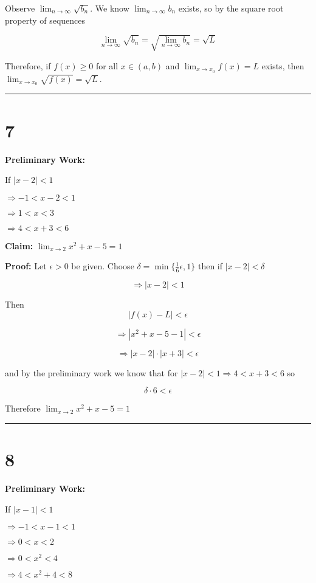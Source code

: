 \documentclass[10pt,letterpaper]{article}
\newcommand\ds{\displaystyle}
\newcommand\qedsym{\hfill \rule{2mm}{2mm}}
\begin{document}
Observe $\ds\lim_{n\to\infty}\sqrt{b_n}$. We know $\ds\lim_{n\to\infty}b_n$ exists, so by the square root property of sequences

\[\ds\lim_{n\to\infty}\sqrt{b_n} = \sqrt{\ds\lim_{n\to\infty}b_n} = \sqrt{L}\]

Therefore, if $f(x) \geq 0$ for all $x\in(a,b)$ and $\ds\lim_{x\to x_0} f(x) = L$ exists, then $\ds\lim_{x\to x_0} \sqrt{f(x)} = \sqrt{L}$.

\qedsym

\section*{7}

\textbf{Preliminary Work:}

If $|x-2| < 1$

$\Rightarrow -1 < x-2 < 1$

$\Rightarrow 1 < x < 3$

$\Rightarrow 4 < x+3 < 6$

\medskip

\textbf{Claim:} $\ds\lim_{x\to 2} x^2 + x - 5 = 1$

\medskip

\textbf{Proof:} Let $\epsilon > 0$ be given. Choose $\delta = \min\{\frac{1}{6}\epsilon,1\}$ then if $|x-2| < \delta$

\[\Rightarrow |x-2| < 1\]

Then \[|f(x) - L| < \epsilon\]

\[\Rightarrow |x^2 + x - 5 - 1| < \epsilon\]

\[\Rightarrow |x-2| \cdot |x+3| < \epsilon\]

and by the preliminary work we know that for $|x-2|<1 \Rightarrow 4 < x+3 < 6$ so

\[\delta \cdot 6 < \epsilon\]

Therefore $\ds\lim_{x\to 2} x^2 + x - 5 = 1$

\qedsym

\section*{8}

\textbf{Preliminary Work:}

If $|x-1| < 1$

$\Rightarrow -1 < x-1 < 1$

$\Rightarrow 0 < x < 2$

$\Rightarrow 0 < x^2 < 4$

$\Rightarrow 4 < x^2+4 < 8$
\end{document}
